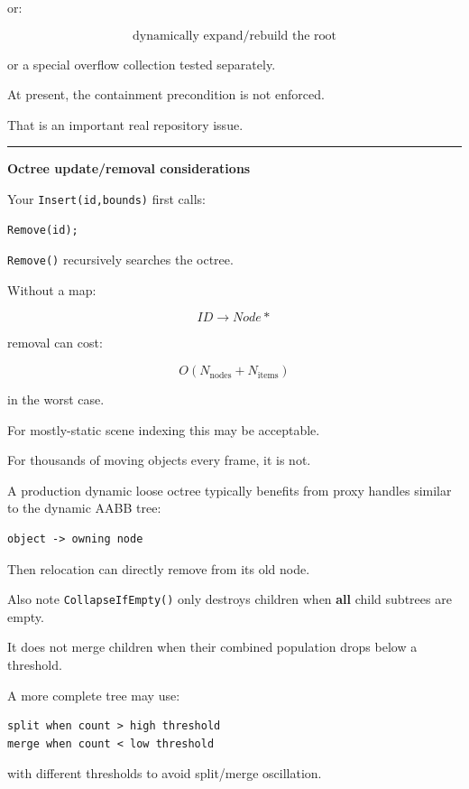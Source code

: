 or:

\[
\boxed{
\text{dynamically expand/rebuild the root}
}
\]

or a special overflow collection tested separately.

At present, the containment precondition is not enforced.

That is an important real repository issue.

\begin{center}\rule{0.5\linewidth}{0.5pt}\end{center}

\textbf{Octree update/removal considerations}

Your \texttt{Insert(id,bounds)} first calls:

\begin{verbatim}
Remove(id);
\end{verbatim}

\texttt{Remove()} recursively searches the octree.

Without a map:

\[
ID\rightarrow Node*
\]

removal can cost:

\[
O(N_{\text{nodes}}+N_{\text{items}})
\]

in the worst case.

For mostly-static scene indexing this may be acceptable.

For thousands of moving objects every frame, it is not.

A production dynamic loose octree typically benefits from proxy handles similar to the dynamic AABB tree:

\begin{verbatim}
object -> owning node
\end{verbatim}

Then relocation can directly remove from its old node.

Also note \texttt{CollapseIfEmpty()} only destroys children when \textbf{all} child subtrees are empty.

It does not merge children when their combined population drops below a threshold.

A more complete tree may use:

\begin{verbatim}
split when count > high threshold
merge when count < low threshold
\end{verbatim}

with different thresholds to avoid split/merge oscillation.


